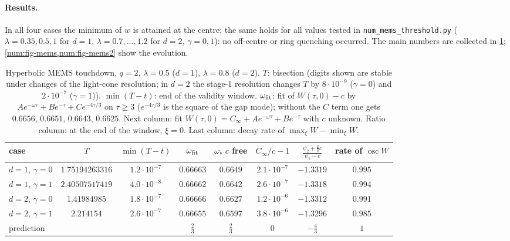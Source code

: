 \paragraph{Results.} In all four cases the minimum of $w$ is attained at the
centre; the same holds for all values tested in \texttt{num\_mems\_threshold.py}
($\lambda=0.35,0.5,1$ for $d=1$, $\lambda=0.7,\dots,1.2$ for $d=2$, $\gamma=0,1$): no
off-centre or ring quenching occurred. The
main numbers are collected in \cref{num:tab-mems}; \cref{num:fig-mems,num:fig-mems2}
show the evolution.

\begin{table}[ht]
\centering\small
\setlength{\tabcolsep}{4pt}
\begin{tabular}{@{}lccccccc@{}}
\toprule
case & $T$ & $\min(T-t)$ & $\omega_{\rm fit}$ & $\omega$, $c$ free & $C_\infty/c-1$ & $\frac{\psi_2+\frac23c}{\psi_1-c}$ & rate of $\operatorname{osc}W$\\
\midrule
$d=1$, $\gamma=0$ & $1.75194263316$ & $1.2\cdot10^{-7}$ & $0.66663$ & $0.6649$ & $2.1\cdot10^{-7}$ & $-1.3319$ & $0.995$\\
$d=1$, $\gamma=1$ & $2.40507517419$ & $4.0\cdot10^{-8}$ & $0.66662$ & $0.6642$ & $2.6\cdot10^{-7}$ & $-1.3318$ & $0.994$\\
$d=2$, $\gamma=0$ & $1.41984985$ & $1.8\cdot10^{-7}$ & $0.66666$ & $0.6627$ & $1.2\cdot10^{-6}$ & $-1.3312$ & $0.991$\\
$d=2$, $\gamma=1$ & $2.214154$ & $2.6\cdot10^{-7}$ & $0.66655$ & $0.6597$ & $3.8\cdot10^{-6}$ & $-1.3296$ & $0.985$\\
\midrule
prediction & & & $\frac23$ & $\frac23$ & $0$ & $-\frac43$ & $1$\\
\bottomrule
\end{tabular}
\caption{Hyperbolic MEMS touchdown, $q=2$, $\lambda=0.5$ ($d=1$), $\lambda=0.8$
($d=2$). $T$: bisection (digits shown are stable under changes of the
light-cone resolution; in $d=2$ the stage-1 resolution changes $T$ by
$8\cdot10^{-9}$ ($\gamma=0$) and $2\cdot10^{-7}$ ($\gamma=1$)). $\min(T-t)$: end of
the validity window. $\omega_{\rm fit}$: fit of $W(\tau,0)-c$ by
$Ae^{-\omega\tau}+Be^{-\tau}+Ce^{-4\tau/3}$ on $\tau\ge3$ ($e^{-4\tau/3}$ is the
square of the gap mode); without the $C$ term one gets $0.6656$, $0.6651$,
$0.6643$, $0.6625$. Next column: fit $W(\tau,0)=C_\infty+Ae^{-\omega\tau}+Be^{-\tau}$
with $c$ unknown. Ratio column: at the end of the window, $\xi=0$. Last
column: decay rate of $\max_\xi W-\min_\xi W$.}
\label{num:tab-mems}
\end{table}

